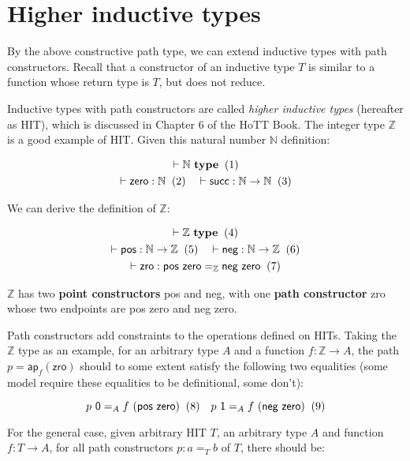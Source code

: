\section{Higher inductive types}
\label{sec:hit}

By the above constructive path type,
we can extend inductive types with path constructors.
Recall that a constructor of an inductive type $T$ is
similar to a function whose return type is $T$,
but does not reduce.

Inductive types with path constructors are called
\textit{higher inductive types} (hereafter as HIT),
which is discussed in Chapter 6 of the HoTT Book.
The integer type $\mathbb Z$ is a good example of HIT.
Given this natural number $\mathbb N$ definition:

\begin{gather*}
  \vdash \mathbb N~\textbf{type}
  \xtag
  \\
  \vdash \textsf{zero} : \mathbb N
  \xtag
  \quad
  \vdash \textsf{succ} : \mathbb N \rightarrow \mathbb N
  \xtag
  \\
\end{gather*}

We can derive the definition of $\mathbb Z$:

\begin{gather*}
  \vdash \mathbb Z~\textbf{type}
  \xtag
  \\
  \vdash \textsf{pos} : \mathbb N \rightarrow \mathbb Z
  \xtag
  \quad
  \vdash \textsf{neg} : \mathbb N \rightarrow \mathbb Z
  \xtag
  \\
  \vdash \textsf{zro} :
  \textsf{pos zero} =_{\mathbb Z} \textsf{neg zero}
  \xtag
\end{gather*}

$\mathbb Z$ has two \textbf{point constructors}
\textsf{pos} and \textsf{neg}, with one \textbf{path constructor}
\textsf{zro} whose two endpoints are \textsf{pos zero} and \textsf{neg zero}.

Path constructors add constraints to the operations defined on HITs.
Taking the $\mathbb Z$ type as an example,
for an arbitrary type $A$ and a function $f : \mathbb Z \rightarrow A$,
the path $p = \textsf{ap}_f(\textsf{zro})$ should to some extent
satisfy the following two equalities
(some model require these equalities to be definitional, some don't):

\[
  p~\textsf 0 =_A f~(\textsf{pos zero})
  \xtag
  \quad
  p~\textsf 1 =_A f~(\textsf{neg zero})
  \xtag
\]

For the general case, given arbitrary HIT $T$, an arbitrary type $A$ and
function $f : T \rightarrow A$, for all path constructors
$p : a =_T b$ of $T$, there should be:

